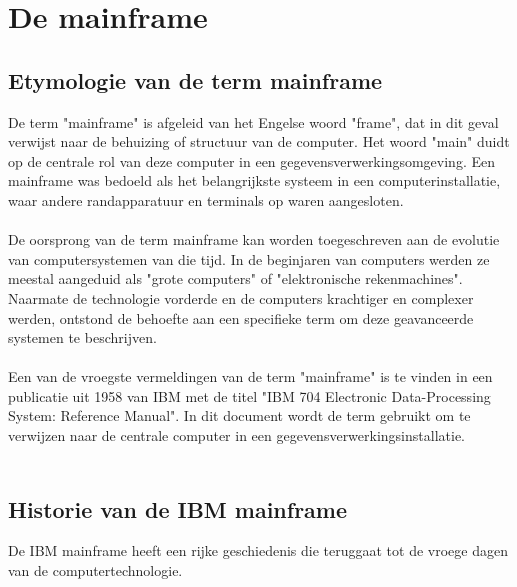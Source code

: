 \section{De mainframe}%
\label{sec:De mainframe}
\subsection{Etymologie van de term mainframe}
\label{sec:Etymologie van de term mainframe}
De term "mainframe" is afgeleid van het Engelse woord "frame", dat in dit geval verwijst naar de behuizing of structuur van de computer. Het woord "main" duidt op de centrale rol van deze computer in een gegevensverwerkingsomgeving. Een mainframe was bedoeld als het belangrijkste systeem in een computerinstallatie, waar andere randapparatuur en terminals op waren aangesloten. \autocite{IBM2023}
\\
\\
De oorsprong van de term mainframe kan worden toegeschreven aan de evolutie van computersystemen van die tijd. In de beginjaren van computers werden ze meestal aangeduid als "grote computers" of "elektronische rekenmachines". Naarmate de technologie vorderde en de computers krachtiger en complexer werden, ontstond de behoefte aan een specifieke term om deze geavanceerde systemen te beschrijven. \autocite{IBM2023}
\\
\\
Een van de vroegste vermeldingen van de term "mainframe" is te vinden in een publicatie uit 1958 van IBM met de titel "IBM 704 Electronic Data-Processing System: Reference Manual". In dit document wordt de term gebruikt om te verwijzen naar de centrale computer in een gegevensverwerkingsinstallatie. \autocite{IBM1955}
\\
\\
\subsection{Historie van de IBM mainframe}
De IBM mainframe heeft een rijke geschiedenis die teruggaat tot de vroege dagen van de computertechnologie.
\\
\\
